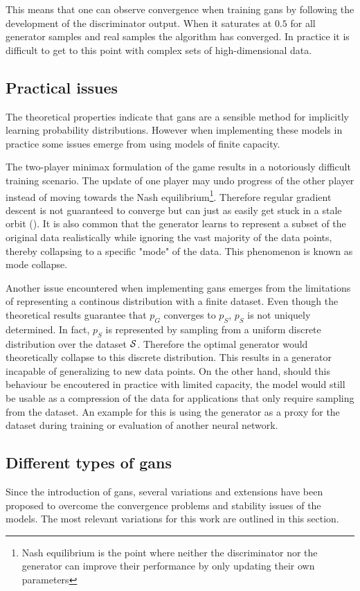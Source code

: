 This means that one can observe convergence when training \acrshort{gans} by following the development of the discriminator output. When it saturates at $0.5$ for all generator samples and real samples the algorithm has converged. In practice it is difficult to get to this point with complex sets of high-dimensional data.

\subsection{Practical issues}
The theoretical properties indicate that \acrshort{gans} are a sensible method for implicitly learning probability distributions. However when implementing these models in practice some issues emerge from using models of finite capacity. 

The two-player minimax formulation of the game results in a notoriously difficult training scenario. The update of one player may undo progress of the other player instead of moving towards the Nash equilibrium\footnote{Nash equilibrium is the point where neither the discriminator nor the generator can improve their performance by only updating their own parameters}. Therefore regular gradient descent is not guaranteed to converge but can just as easily get stuck in a stale orbit (\textcite{salimans2016improved}). It is also common that the generator learns to represent a subset of the original data realistically while ignoring the vast majority of the data points, thereby collapsing to a specific "mode" of the data. This phenomenon is known as mode collapse.

Another issue encountered when implementing \acrshort{gans} emerges from the limitations of representing a continous distribution with a finite dataset. Even though the theoretical results guarantee that $p_G$ converges to $p_S$, $p_S$ is not uniquely determined. In fact, $p_S$ is represented by sampling from a uniform discrete distribution over the dataset $\mathcal{S}$. Therefore the optimal generator would theoretically collapse to this discrete distribution. This results in a generator incapable of generalizing to new data points. On the other hand, should this behaviour be encoutered in practice with limited capacity, the model would still be usable as a compression of the data for applications that only require sampling from the dataset. An example for this is using the generator as a proxy for the dataset during training or evaluation of another neural network.
 
\subsection{Different types of \acrshort{gans}}
Since the introduction of \acrshort{gans}, several variations and extensions have been proposed to overcome the convergence problems and stability issues of the models. The most relevant variations for this work are outlined in this section.

